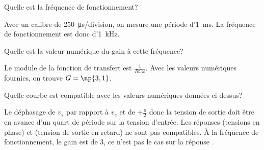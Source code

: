 
\begin{enonce}
  Quelle est la fréquence de fonctionnement?
\end{enonce}


\begin{corrige}
  Avec un calibre de \SI{250}{\micro\second}/division, on mesure une période d’\SI{1}{\milli\second}. La fréquence de fonctionnement est donc d’\SI{1}{\kilo\hertz}.
\end{corrige}




\begin{enonce}
  Quelle est la valeur numérique du gain à cette fréquence?
\end{enonce}


\begin{corrige}
  Le module de la fonction de transfert est \(\frac{1}{RC\omega}\). Avec les valeurs numériques fournies, on trouve \(G = \np{3,1}\).
\end{corrige}




\begin{enonce}
  Quelle courbe est compatible avec les valeurs numériques données ci-dessus?\par
\end{enonce}

\reponse{\reponseB{}}

\begin{corrige}
  Le déphasage de \(v_{s}\) par rapport à \(v_{e}\) et de \(+\frac{\pi}{2}\) donc la tension de sortie doit être en {avance d’un quart de période} sur la tension d’entrée. Les réponses \reponseA{} (tensions en phase) et \reponseC{} (tension de sortie en retard) ne sont pas compatibles.
  À la fréquence de fonctionnement, le gain est de 3, ce n’est pas le cas sur la réponse \reponseD{}.
\end{corrige}

